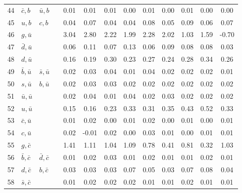 \begin{tabularx}{\textwidth}{rXXX@{}S@{}S@{}S@{}S@{}S@{}S@{}S@{}S@{}S}
 44 & $\bar c, b$      & $\bar u, b$       &                  &  0.01 &  0.01 &  0.01 &  0.00 &  0.01 &  0.00 &  0.01 &  0.00 &  0.00 \\
 45 & $u, b$           & $c, b$            &                  &  0.04 &  0.07 &  0.04 &  0.04 &  0.08 &  0.05 &  0.09 &  0.06 &  0.07 \\
 46 & $g, \bar u$      &                   &                  &  3.04 &  2.80 &  2.22 &  1.99 &  2.28 &  2.02 &  1.03 &  1.59 & -0.70 \\
 47 & $\bar d, \bar u$ &                   &                  &  0.06 &  0.11 &  0.07 &  0.13 &  0.06 &  0.09 &  0.08 &  0.08 &  0.03 \\
 48 & $d, \bar u$      &                   &                  &  0.16 &  0.19 &  0.30 &  0.23 &  0.27 &  0.24 &  0.28 &  0.34 &  0.26 \\
 49 & $\bar b, \bar u$ & $\bar s, \bar u$  &                  &  0.02 &  0.03 &  0.04 &  0.01 &  0.04 &  0.02 &  0.02 &  0.02 &  0.01 \\
 50 & $s, \bar u$      & $b, \bar u$       &                  &  0.02 &  0.03 &  0.03 &  0.02 &  0.02 &  0.02 &  0.02 &  0.02 &  0.02 \\
 51 & $\bar u, \bar u$ &                   &                  &  0.02 &  0.04 &  0.01 &  0.04 &  0.02 &  0.03 &  0.02 &  0.02 &  0.02 \\
 52 & $u, \bar u$      &                   &                  &  0.15 &  0.16 &  0.23 &  0.33 &  0.31 &  0.35 &  0.43 &  0.52 &  0.33 \\
 53 & $\bar c, \bar u$ &                   &                  &  0.01 &  0.02 &  0.00 &  0.01 &  0.02 &  0.00 &  0.01 &  0.00 &  0.01 \\
 54 & $c, \bar u$      &                   &                  &  0.02 & -0.01 &  0.02 &  0.00 &  0.03 &  0.01 &  0.00 &  0.01 &  0.01 \\
 55 & $g, \bar c$      &                   &                  &  1.41 &  1.11 &  1.04 &  1.09 &  0.78 &  0.41 &  0.81 &  0.32 &  1.03 \\
 56 & $\bar b, \bar c$ & $\bar d, \bar c$  &                  &  0.01 &  0.02 &  0.03 &  0.01 &  0.02 &  0.01 &  0.01 &  0.02 &  0.01 \\
 57 & $d, \bar c$      & $b, \bar c$       &                  &  0.03 &  0.03 &  0.03 &  0.07 &  0.05 &  0.03 &  0.07 &  0.08 &  0.04 \\
 58 & $\bar s, \bar c$ &                   &                  &  0.01 &  0.02 &  0.02 &  0.02 &  0.01 &  0.01 &  0.02 &  0.01 &  0.01 \\

\end{tabularx}
